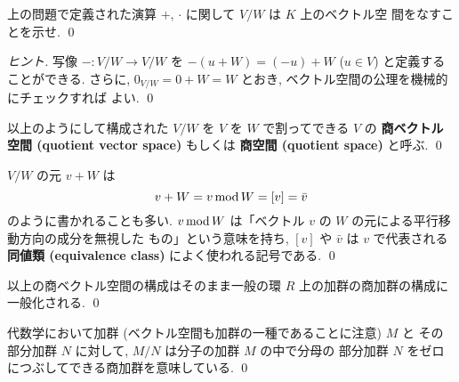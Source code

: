 \documentclass[12pt,twoside]{jarticle}
\begin{document}

\begin{question}
  上の問題で定義された演算 $+$, $\cdot$ に関して $V/W$ は $K$ 上のベクトル空
  間をなすことを示せ. 
  \qed
\end{question}

\begin{proof}[ヒント]
  写像 $-:V/W\to V/W$ を $-(u+W)=(-u)+W$ ($u\in V$) と定義することができる.
  さらに, $0_{V/W}=0+W=W$ とおき, ベクトル空間の公理を機械的にチェックすれば
  よい.
  \qed
\end{proof}


\begin{definition}[商ベクトル空間]
  以上のようにして構成された $V/W$ を $V$ を $W$ で割ってできる $V$ の
  {\bf 商ベクトル空間 (quotient vector space)} もしくは
  {\bf 商空間 (quotient space)} と呼ぶ.
  \qed
\end{definition}

\begin{guide}[商ベクトル空間の元の記号について]
  $V/W$ の元 $v+W$ は 
  \begin{equation*}
    v+W = v\mathop{\mathrm{mod}}\nolimits W = [v] = \bar v
  \end{equation*}
  のように書かれることも多い.
  $v\mathop{\mathrm{mod}}\nolimits W$ は「ベクトル $v$ の $W$ の元による平行移動方向の成分を無視した
  もの」という意味を持ち, $[v]$ や $\bar v$ は $v$ で代表される{\bf 同値類 
  (equivalence class)} によく使われる記号である.
  \qed
\end{guide}


\begin{guide}
  以上の商ベクトル空間の構成はそのまま一般の環 $R$ 上の加群の商加群の構成に
  一般化される. \qed
\end{guide}


\begin{guide}[$M/N$ という記号法について]
  代数学において加群 (ベクトル空間も加群の一種であることに注意) $M$ と
  その部分加群 $N$ に対して, $M/N$ は分子の加群 $M$ の中で分母の
  部分加群 $N$ をゼロにつぶしてできる商加群を意味している.
  \qed
\end{guide}

\end{document}
